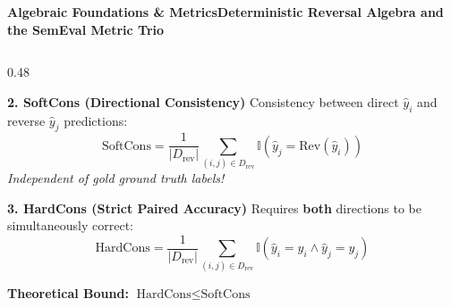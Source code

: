 \documentclass[aspectratio=169,10pt]{beamer}
\begin{document}
\begin{frame}{\textbf{Algebraic Foundations \& Metrics}}{\textbf{Deterministic Reversal Algebra and the SemEval Metric Trio}}
\begin{columns}[T]
    \begin{column}{0.48\textwidth}
      \begin{block}{\textbf{2. SoftCons (Directional Consistency)}}
        \footnotesize
        Consistency between direct $\hat{y}_i$ and reverse $\hat{y}_j$ predictions:
        \vspace{-3pt}
        \[ \text{SoftCons} = \frac{1}{|D_{\text{rev}}|} \sum_{(i, j) \in D_{\text{rev}}} \mathbb{I}\left(\hat{y}_j = \text{Rev}(\hat{y}_i)\right) \]
        \vspace{-3pt}
        \textit{Independent of gold ground truth labels!}
      \end{block}
      \vspace{0.05cm}
      \begin{block}{\textbf{3. HardCons (Strict Paired Accuracy)}}
        \footnotesize
        Requires \textbf{both} directions to be simultaneously correct:
        \vspace{-3pt}
        \[ \text{HardCons} = \frac{1}{|D_{\text{rev}}|} \sum_{(i, j) \in D_{\text{rev}}} \mathbb{I}\left(\hat{y}_i = y_i \land \hat{y}_j = y_j\right) \]
        \vskip 1pt
        \centerline{\scriptsize\textbf{Theoretical Bound:} $\text{HardCons} \le \text{SoftCons}$}
      \end{block}
    \end{column}
  \end{columns}
\end{frame}
\end{document}
